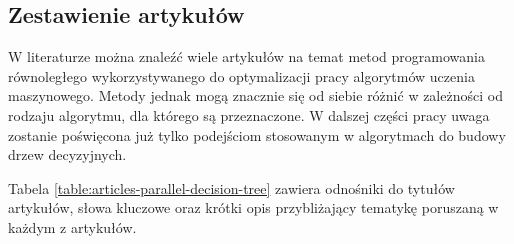 \documentclass[12pt]{article}
\begin{document}
\subsection{Zestawienie artykułów}

W literaturze można znaleźć wiele artykułów na temat metod programowania równoległego wykorzystywanego do optymalizacji pracy algorytmów uczenia maszynowego. 
Metody jednak mogą znacznie się od siebie różnić w zależności od rodzaju algorytmu, dla którego są przeznaczone. W dalszej części pracy uwaga zostanie poświęcona
już tylko podejściom stosowanym w algorytmach do budowy drzew decyzyjnych.

Tabela \ref{table:articles-parallel-decision-tree} zawiera odnośniki do tytułów artykułów, słowa kluczowe oraz krótki opis przybliżający tematykę poruszaną w każdym z artykułów.
\end{document}
